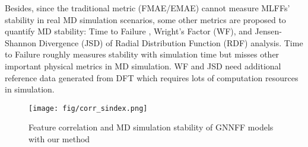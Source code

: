 Besides, since the traditional metric (FMAE/EMAE) cannot measure MLFFs' stability in real MD simulation scenarios, some other metrics are proposed to quantify MD stability: Time to Failure \citep{ibayashi_allegro-legato_2023}, Wright's Factor (WF), and Jensen-Shannon Divergence (JSD) \citep{rajak_ex-nnqmd_2021} of Radial Distribution Function (RDF) analysis. Time to Failure roughly measures stability with simulation time but misses other important physical metrics in MD simulation. WF and JSD need additional reference data generated from DFT which requires lots of computation resources in simulation.

\begin{figure}[t]
  \centering
  \texttt{[image: fig/corr\_sindex.png]}
  \caption{Feature correlation and MD simulation stability of GNNFF models with our method}
  \label{fig_corr_sindex}
  \vspace*{-1.0\baselineskip}
\end{figure}